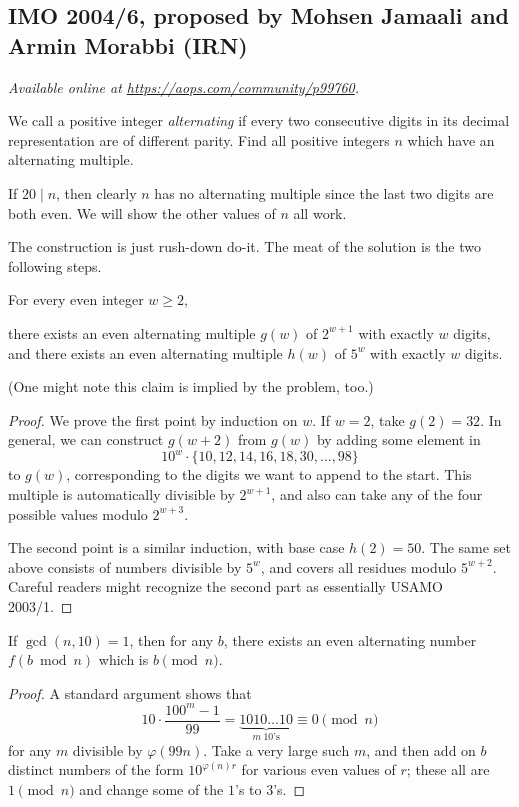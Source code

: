 \documentclass[11pt]{scrartcl}
\begin{document}
\subsection{IMO 2004/6, proposed by Mohsen Jamaali and Armin Morabbi (IRN)}
\textsl{Available online at \url{https://aops.com/community/p99760}.}
\begin{mdframed}[style=mdpurplebox,frametitle={Problem statement}]
We call a positive integer \emph{alternating} if every two consecutive digits
in its decimal representation are of different parity.
Find all positive integers $n$ which have an alternating multiple.
\end{mdframed}
If $20 \mid n$, then clearly $n$ has no alternating
multiple since the last two digits are both even.
We will show the other values of $n$ all work.

The construction is just rush-down do-it.
The meat of the solution is the two following steps.
\begin{claim*}
  For every even integer $w \ge 2$,
  \begin{itemize}
    \ii there exists an even alternating multiple $g(w)$ of $2^{w+1}$
    with exactly $w$ digits, and
    \ii there exists an even alternating multiple $h(w)$ of $5^{w}$
    with exactly $w$ digits.
  \end{itemize}
\end{claim*}
(One might note this claim is implied by the problem, too.)
\begin{proof}
  We prove the first point by induction on $w$.
  If $w = 2$, take $g(2) = 32$.
  In general, we can construct $g(w+2)$ from $g(w)$
  by adding some element in
  \[ 10^w \cdot \{10, 12, 14, 16, 18, 30, \dots, 98\} \]
  to $g(w)$, corresponding to the digits
  we want to append to the start.
  This multiple is automatically divisible by $2^{w+1}$,
  and also can take any of the four possible values modulo $2^{w+3}$.

  The second point is a similar induction,
  with base case $h(2) = 50$.
  The same set above consists of numbers divisible by $5^w$,
  and covers all residues modulo $5^{w+2}$.
  Careful readers might recognize the second part
  as essentially USAMO 2003/1.
\end{proof}

\begin{claim*}
  If $\gcd(n,10) = 1$, then for any $b$,
  there exists an even alternating number $f(b \bmod n)$ which is
  $b \pmod n$.
\end{claim*}
\begin{proof}
  A standard argument shows that
  \[ 10 \cdot \frac{100^m-1}{99}
    = \underbrace{1010\dots10}_{m\ 10\text{'s}}
    \equiv 0 \pmod n \]
  for any $m$ divisible by $\varphi(99n)$.
  Take a very large such $m$,
  and then add on $b$ distinct numbers of the form $10^{\varphi(n)r}$
  for various even values of $r$; these all are $1 \pmod n$
  and change some of the $1$'s to $3$'s.
\end{proof}
\end{document}
